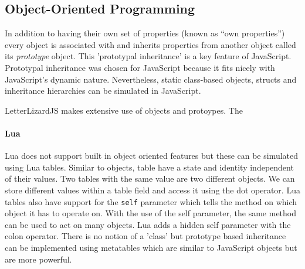 
\subsection{Object-Oriented Programming}
\label{oop}


In addition to having their own set of properties (known as ``own properties'') every
object is associated with and inherits properties from another object called its
\emph{prototype} object. This 'prototypal inheritance' is a key feature of JavaScript.
Prototypal inheritance was chosen for JavaScript because it fits nicely with JavaScript's
dynamic nature. Nevertheless, static class-based
objects, structs and inheritance hierarchies can be simulated in JavaScript. 

LetterLizardJS makes extensive use of objects and protoypes. The 

\paragraph{Lua}
Lua does not support built in object oriented features but these can be simulated using Lua tables. Similar to objects, table have a state and identity independent of their values. Two tables with the same value are two different objects. We can store different values within a table field and access it using the dot operator. Lua tables also have support for the \texttt{self} parameter which tells the method on which object it has to operate on. With the use of the self parameter, the same method can be used to act on many objects. Lua adds a hidden self parameter with the colon operator. There is no notion of a 'class' but prototype based inheritance can be implemented using metatables which are similar to JavaScript objects but are more powerful. 
